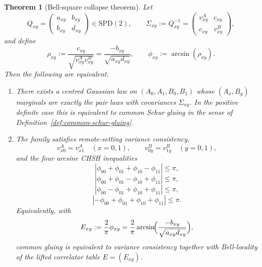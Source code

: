 \documentclass[11pt]{article}
\numberwithin{equation}{section}
\newcommand{\SPD}{\mathrm{SPD}}
\theoremstyle{thmcompact}
\newtheorem{theorem}{Theorem}[section]
\theoremstyle{remark}
\begin{document}
\begin{theorem}[Bell-square collapse theorem]\label{thm:bell-collapse}
Let
\[
Q_{xy}=\begin{pmatrix} a_{xy} & b_{xy}\\ b_{xy} & d_{xy}\end{pmatrix}\in\SPD(2),
\qquad
\Sigma_{xy}:=Q_{xy}^{-1}=\begin{pmatrix} v^A_{xy} & c_{xy}\\ c_{xy} & v^B_{xy}\end{pmatrix},
\]
and define
\begin{equation}\label{eq:bell-rho-def}
\rho_{xy}:=\frac{c_{xy}}{\sqrt{v^A_{xy}v^B_{xy}}}=\frac{-b_{xy}}{\sqrt{a_{xy}d_{xy}}},
\qquad
\phi_{xy}:=\arcsin(\rho_{xy}).
\end{equation}
Then the following are equivalent.
\begin{enumerate}
\item There exists a centred Gaussian law on $(A_0,A_1,B_0,B_1)$ whose $(A_x,B_y)$ marginals are exactly the pair laws with covariances $\Sigma_{xy}$. In the positive definite case this is equivalent to common Schur gluing in the sense of Definition~\ref{def:common-schur-gluing}.
\item The family satisfies remote-setting variance consistency,
\begin{equation}\label{eq:variance-consistency-body}
v^A_{x0}=v^A_{x1}\quad (x=0,1),
\qquad
v^B_{0y}=v^B_{1y}\quad (y=0,1),
\end{equation}
and the four arcsine CHSH inequalities
\begin{equation}\label{eq:arcsine-chsh-body-a}
|\phi_{00}+\phi_{01}+\phi_{10}-\phi_{11}|\le \pi,
\end{equation}
\begin{equation}\label{eq:arcsine-chsh-body-b}
|\phi_{00}+\phi_{01}-\phi_{10}+\phi_{11}|\le \pi,
\end{equation}
\begin{equation}\label{eq:arcsine-chsh-body-c}
|\phi_{00}-\phi_{01}+\phi_{10}+\phi_{11}|\le \pi,
\end{equation}
\begin{equation}\label{eq:arcsine-chsh-body-d}
|-\phi_{00}+\phi_{01}+\phi_{10}+\phi_{11}|\le \pi.
\end{equation}
Equivalently, with
\begin{equation}\label{eq:bell-lifted-correlators}
E_{xy}:=\frac{2}{\pi}\phi_{xy}=\frac{2}{\pi}\arcsin\!\Bigl(\frac{-b_{xy}}{\sqrt{a_{xy}d_{xy}}}\Bigr),
\end{equation}
common gluing is equivalent to variance consistency together with Bell-locality of the lifted correlator table $E=(E_{xy})$.
\end{enumerate}
\end{theorem}
\end{document}
